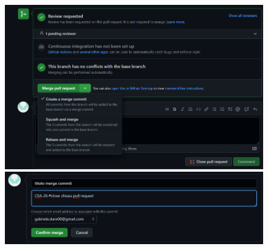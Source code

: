     \begin{figure}[h!]
        \includegraphics[width=15cm]{img/git_pull_request.png}
        \newline \includegraphics[width=15cm]{img/git_pull_request_commit.png}
    \end{figure}
    \clearpage

